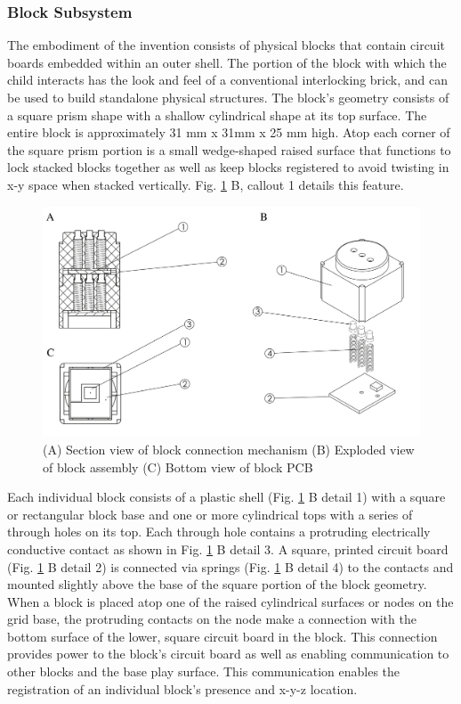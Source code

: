 \documentclass[]{article}
\begin{document}
\subsubsection{Block Subsystem}
The embodiment of the invention consists of physical blocks that contain circuit boards embedded within an outer shell. The portion of the block with which the child interacts has the look and feel of a conventional interlocking brick, and can be used to build standalone physical structures. The block’s geometry consists of a square prism shape with a shallow cylindrical shape at its top surface. The entire block is approximately 31 mm x 31mm x 25 mm high. Atop each corner of the square prism portion is a small wedge-shaped raised surface that functions to lock stacked blocks together as well as keep blocks registered to avoid twisting in x-y space when stacked vertically. Fig. \ref{fig:block} B, callout 1 details this feature.
\begin{figure}
	\includegraphics[width=\textwidth]{Figures/single_block}
	\caption{(A) Section view of block connection mechanism (B) Exploded view of block assembly (C) Bottom view of block PCB}
	\label{fig:block}
\end{figure}

Each individual block consists of a plastic shell (Fig. \ref{fig:block} B detail 1) with a square or rectangular block base and one or more cylindrical tops with a series of through holes on its top.  Each through hole contains a protruding electrically conductive contact as shown in Fig. \ref{fig:block} B detail 3. A square, printed circuit board (Fig. \ref{fig:block} B detail 2) is connected via springs (Fig. \ref{fig:block} B detail 4) to the contacts and mounted slightly above the base of the square portion of the block geometry. When a block is placed atop one of the raised cylindrical surfaces or nodes on the grid base, the protruding contacts on the node make a connection with the bottom surface of the lower, square circuit board in the block. This connection provides power to the block’s circuit board as well as enabling communication to other blocks and the base play surface. This communication enables the registration of an individual block’s presence and x-y-z location. 
\end{document}
